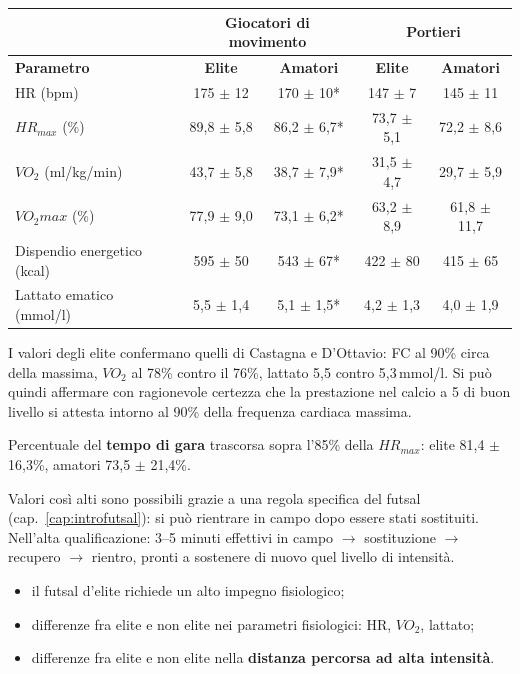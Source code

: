 
\begin{center}
\footnotesize
\begin{tabular}{|l|c|c|c|c|}
\hline
 & \multicolumn{2}{c|}{\textbf{Giocatori di movimento}} & \multicolumn{2}{c|}{\textbf{Portieri}} \\
\hline
\textbf{Parametro} & \textbf{Elite} & \textbf{Amatori} & \textbf{Elite} & \textbf{Amatori} \\
\hline
HR (bpm)                   & 175 $\pm$ 12   & 170 $\pm$ 10*   & 147 $\pm$ 7    & 145 $\pm$ 11 \\
$HR_{max}$ (\%)            & 89,8 $\pm$ 5,8 & 86,2 $\pm$ 6,7* & 73,7 $\pm$ 5,1 & 72,2 $\pm$ 8,6 \\
$VO_2$ (ml/kg/min)         & 43,7 $\pm$ 5,8 & 38,7 $\pm$ 7,9* & 31,5 $\pm$ 4,7 & 29,7 $\pm$ 5,9 \\
$VO_{2}max$ (\%)           & 77,9 $\pm$ 9,0 & 73,1 $\pm$ 6,2* & 63,2 $\pm$ 8,9 & 61,8 $\pm$ 11,7 \\
Dispendio energetico (kcal)& 595 $\pm$ 50   & 543 $\pm$ 67*   & 422 $\pm$ 80   & 415 $\pm$ 65 \\
Lattato ematico (mmol/l)   & 5,5 $\pm$ 1,4  & 5,1 $\pm$ 1,5*  & 4,2 $\pm$ 1,3  & 4,0 $\pm$ 1,9 \\
\hline
\end{tabular}
\end{center}

I valori degli elite confermano quelli di Castagna e D'Ottavio: FC al 90\% circa della massima,
$VO_2$ al 78\% contro il 76\%, lattato 5,5 contro 5,3\,mmol/l. Si può quindi affermare con
ragionevole certezza che la prestazione nel calcio a 5 di buon livello si attesta intorno al 90\%
della frequenza cardiaca massima.

Percentuale del \textbf{tempo di gara} trascorsa sopra l'85\% della $HR_{max}$: elite 81,4 $\pm$
16,3\%, amatori 73,5 $\pm$ 21,4\%.

Valori così alti sono possibili grazie a una regola specifica del futsal
(cap.~\ref{cap:introfutsal}): si può rientrare in campo dopo essere stati sostituiti. Nell'alta
qualificazione: 3--5 minuti effettivi in campo $\rightarrow$ sostituzione $\rightarrow$ recupero
$\rightarrow$ rientro, pronti a sostenere di nuovo quel livello di intensità.

\begin{itemize}
  \item il futsal d'elite richiede un alto impegno fisiologico;
  \item differenze fra elite e non elite nei parametri fisiologici: HR, $VO_2$, lattato;
  \item differenze fra elite e non elite nella \textbf{distanza percorsa ad alta intensità}.
\end{itemize}

